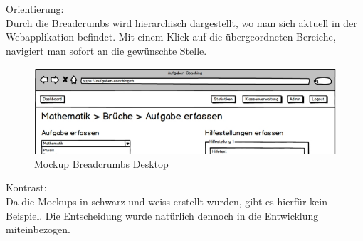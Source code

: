 Orientierung: \\
Durch die Breadcrumbs wird hierarchisch dargestellt, wo man sich aktuell in der Webapplikation befindet. Mit einem Klick auf die übergeordneten Bereiche, navigiert man sofort an die gewünschte Stelle. \\
\begin{minipage}{\textwidth}
	\begin{figure}[H]
	\centering
		\includegraphics[width=\textwidth, keepaspectratio]{images/Mockups/Breadcrumbs_Desktop.png}
		\caption{Mockup Breadcrumbs Desktop}
	\end{figure}
\end{minipage}


Kontrast: \\
Da die Mockups in schwarz und weiss erstellt wurden, gibt es hierfür kein Beispiel. Die Entscheidung wurde natürlich dennoch in die Entwicklung miteinbezogen.


\newpage